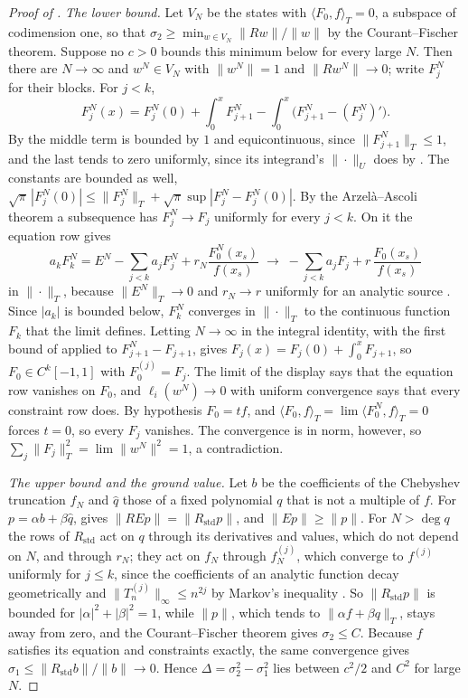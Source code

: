 \begin{proof}[Proof of ]
\emph{The lower bound.} Let $V_N$ be the states with $\langle F_0,f\rangle_T=0$, a subspace of codimension one, so that $\sigma_2\ge\min_{w\in V_N}\|Rw\|/\|w\|$ by the Courant--Fischer theorem. Suppose no $c>0$ bounds this minimum below for every large $N$. Then there are $N\to\infty$ and $w^N\in V_N$ with $\|w^N\|=1$ and $\|Rw^N\|\to0$; write $F_j^N$ for their blocks. For $j<k$,
\begin{equation*}
    F_j^N(x)=F_j^N(0)+\int_0^xF_{j+1}^N-\int_0^x\bigl(F_{j+1}^N-(F_j^N)'\bigr).
\end{equation*}
By  the middle term is bounded by $1$ and equicontinuous, since $\|F_{j+1}^N\|_T\le1$, and the last tends to zero uniformly, since its integrand's $\|\cdot\|_U$ does by . The constants are bounded as well, $\sqrt\pi\,|F_j^N(0)|\le\|F_j^N\|_T+\sqrt\pi\sup|F_j^N-F_j^N(0)|$. By the Arzelà--Ascoli theorem a subsequence has $F_j^N\to F_j$ uniformly for every $j<k$. On it the equation row gives
\begin{equation*}
    a_kF_k^N=E^N-\sum_{j<k}a_jF_j^N+r_N\frac{F_0^N(x_s)}{f(x_s)}\;\longrightarrow\;-\sum_{j<k}a_jF_j+r\,\frac{F_0(x_s)}{f(x_s)}
\end{equation*}
in $\|\cdot\|_T$, because $\|E^N\|_T\to0$ and $r_N\to r$ uniformly for an analytic source \cite[Ch.~8]{trefethen2013approximation}. Since $|a_k|$ is bounded below, $F_k^N$ converges in $\|\cdot\|_T$ to the continuous function $F_k$ that the limit defines. Letting $N\to\infty$ in the integral identity, with the first bound of  applied to $F_{j+1}^N-F_{j+1}$, gives $F_j(x)=F_j(0)+\int_0^xF_{j+1}$, so $F_0\in C^k[-1,1]$ with $F_0^{(j)}=F_j$. The limit of the display says that the equation row vanishes on $F_0$, and $\ell_i(w^N)\to0$ with uniform convergence says that every constraint row does. By hypothesis $F_0=tf$, and $\langle F_0,f\rangle_T=\lim\langle F_0^N,f\rangle_T=0$ forces $t=0$, so every $F_j$ vanishes. The convergence is in norm, however, so $\sum_j\|F_j\|_T^2=\lim\|w^N\|^2=1$, a contradiction.

\emph{The upper bound and the ground value.} Let $b$ be the coefficients of the Chebyshev truncation $f_N$ and $\hat q$ those of a fixed polynomial $q$ that is not a multiple of $f$. For $p=\alpha b+\beta\hat q$,  gives $\|REp\|=\|R_{\mathrm{std}}p\|$, and $\|Ep\|\ge\|p\|$. For $N>\deg q$ the rows of $R_{\mathrm{std}}$ act on $q$ through its derivatives and values, which do not depend on $N$, and through $r_N$; they act on $f_N$ through $f_N^{(j)}$, which converge to $f^{(j)}$ uniformly for $j\le k$, since the coefficients of an analytic function decay geometrically \cite[Ch.~8]{trefethen2013approximation} and $\|T_n^{(j)}\|_\infty\le n^{2j}$ by Markov's inequality \cite{borweinerdelyi1995}. So $\|R_{\mathrm{std}}p\|$ is bounded for $|\alpha|^2+|\beta|^2=1$, while $\|p\|$, which tends to $\|\alpha f+\beta q\|_T$, stays away from zero, and the Courant--Fischer theorem gives $\sigma_2\le C$. Because $f$ satisfies its equation and constraints exactly, the same convergence gives $\sigma_1\le\|R_{\mathrm{std}}b\|/\|b\|\to0$. Hence $\Delta=\sigma_2^2-\sigma_1^2$ lies between $c^2/2$ and $C^2$ for large $N$.


\end{proof}
